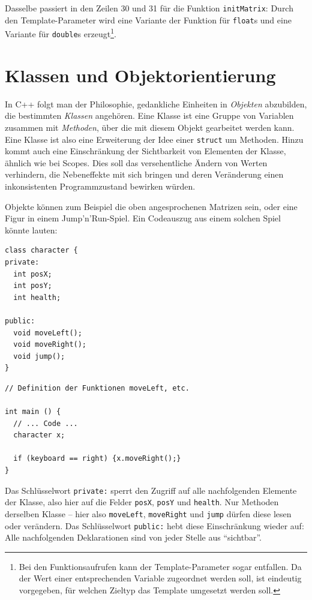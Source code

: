 Dasselbe passiert in den Zeilen 30 und 31 für die Funktion \texttt{initMatrix}: Durch den Template-Parameter wird eine Variante der Funktion für \texttt{float}s und eine Variante für \texttt{double}s erzeugt\footnote{Bei den Funktionsaufrufen kann der Template-Parameter sogar entfallen. Da der Wert einer entsprechenden Variable zugeordnet werden soll, ist eindeutig vorgegeben, für welchen Zieltyp das Template umgesetzt werden soll.}.


\section{Klassen und Objektorientierung}
In C++ folgt man der Philosophie, gedankliche Einheiten in \emph{Objekten} abzubilden, die bestimmten \emph{Klassen} angehören. Eine Klasse ist eine Gruppe von Variablen zusammen mit \emph{Methoden}, über die mit diesem Objekt gearbeitet werden kann. Eine Klasse ist also eine Erweiterung der Idee einer \texttt{struct} um Methoden. Hinzu kommt auch eine Einschränkung der Sichtbarkeit von Elementen der Klasse, ähnlich wie bei Scopes. Dies soll das versehentliche Ändern von Werten verhindern, die Nebeneffekte mit sich bringen und deren Veränderung einen inkonsistenten Programmzustand bewirken würden.

Objekte können zum Beispiel die oben angesprochenen Matrizen sein, oder eine Figur in einem Jump'n'Run-Spiel. Ein Codeauszug aus einem solchen Spiel könnte lauten:

\begin{codebox}
\begin{verbatim}
class character {
private:
  int posX;
  int posY;
  int health;
  
public:
  void moveLeft();
  void moveRight();
  void jump();
}
\end{verbatim}
\end{codebox}

\begin{codebox}[]
\begin{verbatim}
// Definition der Funktionen moveLeft, etc.

int main () {
  // ... Code ...
  character x;
  
  if (keyboard == right) {x.moveRight();}
}
\end{verbatim}
\end{codebox}

Das Schlüsselwort \texttt{private:} sperrt den Zugriff auf alle nachfolgenden Elemente der Klasse, also hier auf die Felder \texttt{posX}, \texttt{posY} und \texttt{health}. Nur Methoden derselben Klasse -- hier also \texttt{moveLeft}, \texttt{moveRight} und \texttt{jump} dürfen diese lesen oder verändern. Das Schlüsselwort \texttt{public:} hebt diese Einschränkung wieder auf: Alle nachfolgenden Deklarationen sind von jeder Stelle aus \enquote{sichtbar}.

